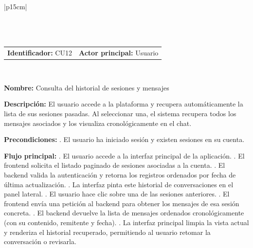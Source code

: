 \begingroup
{}
\setlength{\arrayrulewidth}{1pt}
\begin{longtable}{|p{15cm}|}
  \hline
   \\
  \hline
  \endfirsthead
   \\
  \hline
   \\
  \hline
  \endhead
  \hline {} \\ \hline
  \endfoot
  \hline
  \caption{Caso de uso 12 — Consulta del historial de sesiones y mensajes.}
  \label{TB:CU12_HISTORIAL}
  \endlastfoot

  \begin{tabularx}{\linewidth}{@{}X X@{}}
    \textbf{Identificador:} CU12 & \textbf{Actor principal:} Usuario
  \end{tabularx} \\ \hline

  \textbf{Nombre:} Consulta del historial de sesiones y mensajes \\ \hline

  \textbf{Descripción:} \newline 
  El usuario accede a la plataforma y recupera automáticamente la lista de sus sesiones pasadas. Al seleccionar una, el sistema recupera todos los mensajes asociados y los visualiza cronológicamente en el chat. \\ \hline

  \textbf{Precondiciones:} . El usuario ha iniciado sesión y existen sesiones en su cuenta. \\ \hline

  \textbf{Flujo principal:} . El usuario accede a la interfaz principal de la aplicación. . El frontend solicita el listado paginado de sesiones asociadas a la cuenta. . El backend valida la autenticación y retorna los registros ordenados por fecha de última actualización. . La interfaz pinta este historial de conversaciones en el panel lateral. . El usuario hace clic sobre una de las sesiones anteriores. . El frontend envía una petición al backend para obtener los mensajes de esa sesión concreta. . El backend devuelve la lista de mensajes ordenados cronológicamente (con su contenido, remitente y fecha). . La interfaz principal limpia la vista actual y renderiza el historial recuperado, permitiendo al usuario retomar la conversación o revisarla. \\ \hline


\end{longtable}
